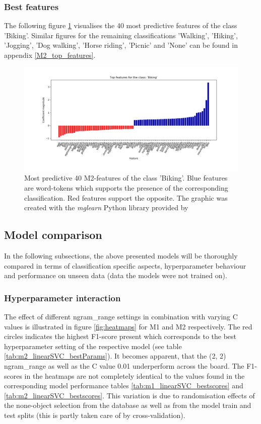 \subsubsection{Best features}
The following figure \ref{fig:M2_top40_features_biking} visualises the 40 most predictive features of the class 'Biking'. Similar figures for the remaining classifications 'Walking', 'Hiking', 'Jogging', 'Dog walking', 'Horse riding', 'Picnic' and 'None' can be found in appendix \ref{M2_top_features}. 
\begin{figure}[h!]
   \centering
   \includegraphics[width=\textwidth]{img/m2_top_40_features_Biking_cropped.pdf}
   \caption{Most predictive 40 M2-features of the class 'Biking'. Blue features are word-tokens which supports the presence of the corresponding classification. Red features support the opposite. The graphic was created with the \textit{mglearn} Python library provided by \parencite{Guido2016}}
   \label{fig:M2_top40_features_biking}
\end{figure}

\subsection{Model comparison}
In the following subsections, the above presented models will be thoroughly compared in terms of classification specific aspects, hyperparameter behaviour and performance on unseen data (data the models were not trained on). 

\subsubsection{Hyperparameter interaction}
The effect of different ngram\_range settings in combination with varying C values is illustrated in figure \ref{fig:heatmaps} for M1 and M2 respectively. The red circles indicates the highest F1-score present which corresponds to the best hyperparameter setting of the respective model (see table \ref{tab:m2_linearSVC_bestParams}). It becomes apparent, that the (2, 2) ngram\_range as well as the C value 0.01 underperform across the board. The F1-scores in the heatmaps are not completely identical to the values found in the corresponding model performance tables \ref{tab:m1_linearSVC_bestscores} and \ref{tab:m2_linearSVC_bestscores}. This variation is due to randomisation effects of the none-object selection from the database as well as from the model train and test splits (this is partly taken care of by cross-validation).\\

